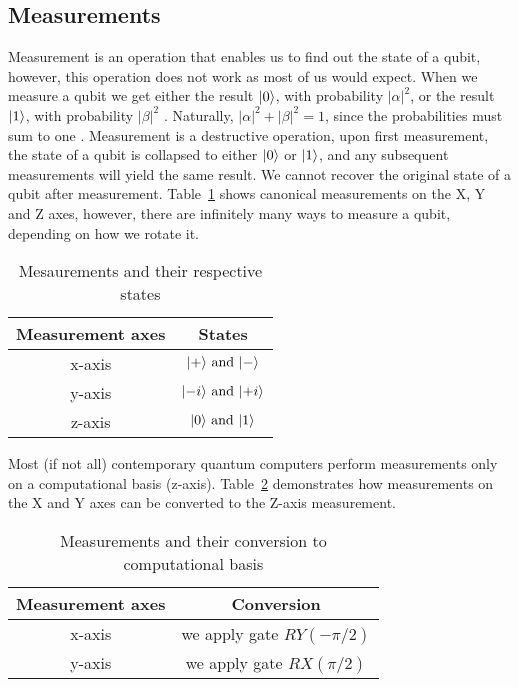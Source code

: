 \subsection{Measurements}
Measurement is an operation that enables us to find out the state of a qubit, however, this operation does not work as most of us would expect. When we measure a qubit we get either the result $\lvert0\rangle$, with probability $\lvert \alpha \rvert^2$, or the result $\lvert1\rangle$, with probability $\lvert \beta \rvert^2$ \cite{qc}. Naturally, $\lvert \alpha \rvert^2 + \lvert \beta \rvert^2 = 1$, since the probabilities must sum to one \cite{qc}.  Measurement is a destructive operation, upon first measurement, the state of a qubit is collapsed to either $\lvert0\rangle$ or $\lvert1\rangle$, and any subsequent measurements will yield the same result. We cannot recover the original state of a qubit after measurement. Table~\ref{tab:measurements-states} shows canonical measurements on the X, Y and Z axes, however, there are infinitely many ways to measure a qubit, depending on how we rotate it.
\begin{table}[H]
  \centering
  \begin{tabular}{|c|c|} 
      \hline
      \multicolumn{1}{|c|}{\textbf{Measurement axes}} & \textbf{States}\\
      \hline
      x-axis & $\lvert+\rangle \text{ and }\lvert-\rangle$\\ 
      \hline
      y-axis & $\lvert-i\rangle \text{ and }\lvert+i\rangle$\\ 
      \hline
      z-axis & $\lvert0\rangle \text{ and }\lvert1\rangle$\\ 
      \hline
  \end{tabular}
  \caption{Mesaurements and their respective states}
  \label{tab:measurements-states}
\end{table}
Most (if not all) contemporary quantum computers perform measurements only on a computational basis (z-axis). Table~\ref{tab:measurements-conversion} demonstrates how measurements on the X and Y axes can be converted to the Z-axis measurement.~\cite{blog}

\begin{table}[H]
  \centering
  \begin{tabular}{|c|c|} 
      \hline
      \multicolumn{1}{|c|}{\textbf{Measurement axes}} & \textbf{Conversion}\\
      \hline
      x-axis & we apply gate $RY(-\pi/2)$ \\ 
      \hline
      y-axis & we apply gate $RX(\pi/2)$ \\ 
      \hline
  \end{tabular}
  \caption{Measurements and their conversion to computational basis}
  \label{tab:measurements-conversion}
\end{table}

